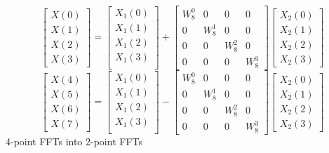 \documentclass[journal,12pt,twocolumn]{IEEEtran}
\renewcommand\thesection{\arabic{section}}
\begin{document}
\begin{enumerate}[label=\thesection.\arabic*]
\begin{equation}
\begin{bmatrix}
X(0) \\ 
X(1) \\ 
X(2) \\ 
X(3)
\end{bmatrix}
=
\begin{bmatrix}
X_{1}(0) \\ 
X_{1}(1)\\ 
X_{1}(2)\\
X_{1}(3)\\
\end{bmatrix}
+
\begin{bmatrix}
W^{0}_{8} & 0 & 0 & 0\\
0 & W^{1}_{8} & 0 & 0\\
0 & 0 & W^{2}_{8} & 0\\
0 & 0 & 0 & W^{3}_{8}
\end{bmatrix}
\begin{bmatrix}
X_{2}(0) \\ 
X_{2}(1) \\ 
X_{2}(2) \\
X_{2}(3)
\end{bmatrix}
\label{eq:8-low}
\end{equation}
\begin{equation}
\begin{bmatrix}
X(4) \\ 
X(5) \\ 
X(6) \\ 
X(7)
\end{bmatrix}
=
\begin{bmatrix}
X_{1}(0) \\ 
X_{1}(1)\\ 
X_{1}(2)\\
X_{1}(3)\\
\end{bmatrix}
-
\begin{bmatrix}
W^{0}_{8} & 0 & 0 & 0\\
0 & W^{1}_{8} & 0 & 0\\
0 & 0 & W^{2}_{8} & 0\\
0 & 0 & 0 & W^{3}_{8}
\end{bmatrix}
\begin{bmatrix}
X_{2}(0) \\ 
X_{2}(1) \\ 
X_{2}(2) \\
X_{2}(3)
\end{bmatrix}
\label{eq:8-high}
\end{equation}
4-point FFTs into 2-point FFTs

\end{enumerate}
\end{document}
